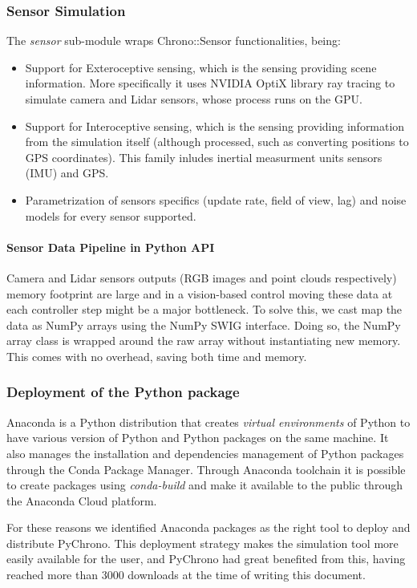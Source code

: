 \documentclass{svproc}
\begin{document}
\subsubsection{Sensor Simulation}
The \textit{sensor} sub-module wraps Chrono::Sensor functionalities, being:
\begin{itemize}
    \item Support for Exteroceptive sensing, which is the sensing providing scene information. More specifically it uses NVIDIA OptiX library ray tracing to simulate camera and Lidar sensors, whose process runs on the GPU.
    \item Support for Interoceptive sensing, which is the sensing providing information from the simulation itself (although processed, such as converting positions to GPS coordinates). This family inludes inertial measurment units sensors (IMU) and GPS.
    \item Parametrization of sensors specifics (update rate, field of view, lag) and noise models for every sensor supported.
\end{itemize}
\paragraph{Sensor Data Pipeline in Python API}
Camera and Lidar sensors outputs (RGB images and point clouds respectively) memory footprint are large and in a vision-based control moving these data at each controller step might be a major bottleneck. To solve this, we cast map the data as NumPy arrays \cite{van2011numpy} using the NumPy SWIG interface. Doing so, the NumPy array class is wrapped around the raw array without instantiating new memory. This comes with no overhead, saving both time and memory.

\subsubsection{Deployment of the Python package}
Anaconda is a Python distribution that creates \textit{virtual environments} of Python to have various version of Python and Python packages on the same machine. It also manages the installation and dependencies management of Python packages through the Conda Package Manager. Through Anaconda toolchain it is possible to create packages using \textit{conda-build} and make it available to the public through the Anaconda Cloud platform.

For these reasons we identified Anaconda packages as the right tool to deploy and distribute PyChrono.
This deployment strategy makes the simulation tool more easily available for the user, and PyChrono had great benefited from this, having reached more than 3000 downloads at the time of writing this document.
\end{document}
